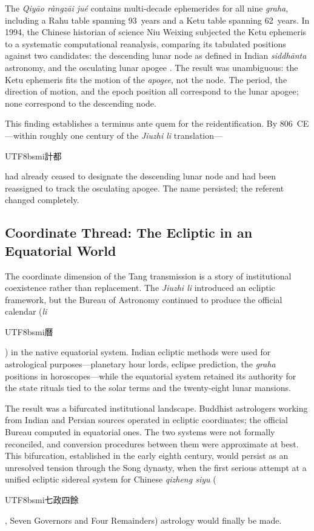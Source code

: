 \documentclass[10pt,a4paper]{article}
\newcommand{\zh}[1]{\begin{CJK}{UTF8}{bsmi}#1\end{CJK}}
\begin{document}
The \textit{Qiy\=ao r\`angz\=ai ju\'e} contains multi-decade ephemerides for
all nine \textit{graha}, including a Rahu table spanning 93~years and a
Ketu table spanning 62~years.  In 1994, the Chinese historian of science
Niu Weixing subjected the Ketu ephemeris to a systematic computational
reanalysis, comparing its tabulated positions against two candidates:
the descending lunar node as defined in Indian \textit{siddh\=anta}
astronomy, and the osculating lunar apogee \cite{niu1995ketu}.  The
result was unambiguous: the Ketu ephemeris fits the motion of the
\emph{apogee}, not the node.  The period, the direction of motion, and
the epoch position all correspond to the lunar apogee; none correspond
to the descending node.

This finding establishes a terminus ante quem for the reidentification.
By 806~CE---within roughly one century of the \textit{Jiuzhi li}
translation---\zh{計都} had already ceased to designate the descending
lunar node and had been reassigned to track the osculating apogee.  The
name persisted; the referent changed completely.

\subsection*{Coordinate Thread: The Ecliptic in an Equatorial World}

The coordinate dimension of the Tang transmission is a story of
institutional coexistence rather than replacement.  The \textit{Jiuzhi li}
introduced an ecliptic framework, but the Bureau of Astronomy continued
to produce the official calendar (\textit{li} \zh{曆}) in the native
equatorial system.  Indian ecliptic methods were used for astrological
purposes---planetary hour lords, eclipse prediction, the \textit{graha}
positions in horoscopes---while the equatorial system retained its
authority for the state rituals tied to the solar terms and the
twenty-eight lunar mansions.

The result was a bifurcated institutional landscape.  Buddhist
astrologers working from Indian and Persian sources operated in ecliptic
coordinates; the official Bureau computed in equatorial ones.  The two
systems were not formally reconciled, and conversion procedures between
them were approximate at best.  This bifurcation, established in the
early eighth century, would persist as an unresolved tension through the
Song dynasty, when the first serious attempt at a unified ecliptic
sidereal system for Chinese \textit{qizheng siyu} (\zh{七政四餘},
Seven Governors and Four Remainders) astrology would finally be made.
\end{document}
